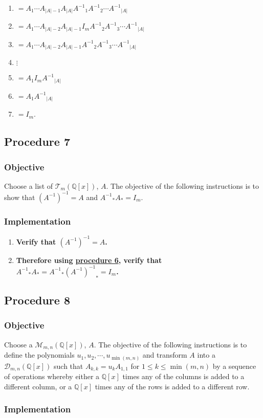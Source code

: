 \documentclass[twocolumn]{article}
\newcommand{\procedure}[2][]{\subsection*{Procedure #2 \ifthenelse{\equal{#1}{}}{}{(#1)}}\label{sec:procedure #2}}
\newcommand{\objective}{\subsubsection*{Objective}}
\newcommand{\implementation}{\subsubsection*{Implementation}}
\begin{document}
\begin{enumerate}
					\begin{enumerate}
						\item $=A_1\cdots A_{\lvert A\rvert-1}A_{\lvert A\rvert}{A^{-1}}_1{A^{-1}}_2\cdots {A^{-1}}_{\lvert A\rvert}$
						\item $=A_1\cdots A_{\lvert A\rvert-2}A_{\lvert A\rvert-1}I_m{A^{-1}}_2{A^{-1}}_3\cdots {A^{-1}}_{\lvert A\rvert}$
						\item $=A_1\cdots A_{\lvert A\rvert-2}A_{\lvert A\rvert-1}{A^{-1}}_2{A^{-1}}_3\cdots {A^{-1}}_{\lvert A\rvert}$
						\item $\vdots$
						\item $=A_1I_m{A^{-1}}_{\lvert A\rvert}$
						\item $=A_1{A^{-1}}_{\lvert A\rvert}$
						\item $=I_m$.
					\end{enumerate}
				\end{enumerate}
		\procedure{7}
			\objective
				Choose a list of $\mathcal{T}_{m}(\mathbb{Q}[x])$, $A$. The objective of the following instructions is to show that $(A^{-1})^{-1}=A$ and ${A^{-1}}_*A_*=I_m$.
			\implementation
				\begin{enumerate}
					\item \textbf{Verify that $(A^{-1})^{-1}=A$.}
					\item \textbf{Therefore using \hyperref[sec:procedure 6]{procedure 6}, verify that ${A^{-1}}_*A_*={A^{-1}}_*{(A^{-1})^{-1}}_*=I_m$.}
				\end{enumerate}
		\procedure{8}
			\objective
				Choose a $\mathcal{M}_{m,n}(\mathbb{Q}[x])$, $A$. The objective of the following instructions is to define the polynomials $u_1,u_2,\cdots,u_{\min(m,n)}$ and transform $A$ into a $\mathcal{D}_{m,n}(\mathbb{Q}[x])$ such that $A_{k,k}=u_kA_{1,1}$ for $1\le k\le\min(m,n)$ by a sequence of operations whereby either a $\mathbb{Q}[x]$ times any of the columns is added to a different column, or a $\mathbb{Q}[x]$ times any of the rows is added to a different row.
			\implementation
\end{document}
